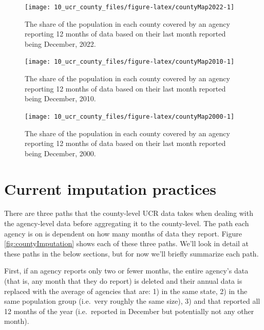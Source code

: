 \documentclass[
  12pt,
  openany]{book}
\begin{document}
\begin{figure}

{\centering \texttt{[image: 10\_ucr\_county\_files/figure-latex/countyMap2022-1]} 

}

\caption{The share of the population in each county covered by an agency reporting 12 months of data based on their last month reported being December, 2022.}\label{fig:countyMap2022}
\end{figure}

\begin{figure}

{\centering \texttt{[image: 10\_ucr\_county\_files/figure-latex/countyMap2010-1]} 

}

\caption{The share of the population in each county covered by an agency reporting 12 months of data based on their last month reported being December, 2010.}\label{fig:countyMap2010}
\end{figure}

\begin{figure}

{\centering \texttt{[image: 10\_ucr\_county\_files/figure-latex/countyMap2000-1]} 

}

\caption{The share of the population in each county covered by an agency reporting 12 months of data based on their last month reported being December, 2000.}\label{fig:countyMap2000}
\end{figure}

\section{Current imputation practices}\label{current-imputation-practices}

There are three paths that the county-level UCR data takes when dealing with the agency-level data before aggregating it to the county-level. The path each agency is on is dependent on how many months of data they report. Figure \ref{fig:countyImputation} shows each of these three paths. We'll look in detail at these paths in the below sections, but for now we'll briefly summarize each path.

First, if an agency reports only two or fewer months, the entire agency's data (that is, any month that they do report) is deleted and their annual data is replaced with the average of agencies that are: 1) in the same state, 2) in the same population group (i.e.~very roughly the same size), 3) and that reported all 12 months of the year (i.e.~reported in December but potentially not any other month).
\end{document}
